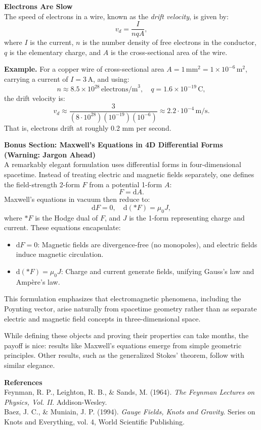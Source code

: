 \begin{technical}
\vspace{0.7em}
\noindent\textbf{Electrons Are Slow}\\[0.5em]
The speed of electrons in a wire, known as the \textit{drift velocity}, is given by:
\[
v_d = \frac{I}{n q A},
\]
where \( I \) is the current, \( n \) is the number density of free electrons in the conductor, \( q \) is the elementary charge, and \( A \) is the cross-sectional area of the wire.

\noindent\textbf{Example.} For a copper wire of cross-sectional area \( A = 1 \, \text{mm}^2 = 1 \times 10^{-6} \, \text{m}^2 \), carrying a current of \( I = 3 \, \text{A} \), and using:
\[
n \approx 8.5 \times 10^{28} \, \text{electrons/m}^3, \quad q = 1.6 \times 10^{-19} \, \text{C},
\]
the drift velocity is:
\[
v_d \approx \frac{3}{(8 \cdot 10^{28})(10^{-19})(10^{-6})} \approx 2.2 \cdot 10^{-4} \, \text{m/s}.
\]
That is, electrons drift at roughly 0.2 mm per second.

\vspace{1em}
\noindent\textbf{Bonus Section: Maxwell’s Equations in 4D Differential Forms (Warning: Jargon Ahead)}\\[0.5em]
A remarkably elegant formulation
uses differential forms in four-dimensional spacetime. Instead of treating electric and magnetic fields separately, one defines the field-strength 2-form \(F\) from a potential 1-form \(A\):  
\[
F = \mathrm{d}A.
\]
Maxwell’s equations in vacuum then reduce to:
\[
\mathrm{d}F = 0, 
\quad
\mathrm{d}(*F) = \mu_0 J,
\]
where \(*F\) is the Hodge dual of \(F\), and \(J\) is the 1-form representing charge and current. These equations encapsulate:
\begin{itemize}[leftmargin=*]
\item \(\mathrm{d}F = 0\): Magnetic fields are divergence-free (no monopoles), and electric fields induce magnetic circulation.
\item \(\mathrm{d}(*F) = \mu_0 J\): Charge and current generate fields, unifying Gauss’s law and Ampère’s law.
\end{itemize}
This formulation emphasizes that electromagnetic phenomena, including the Poynting vector, arise naturally from spacetime geometry rather than as separate electric and magnetic field concepts in three-dimensional space. 

While defining these objects and proving their properties can take months, the payoff is nice: results like Maxwell’s equations emerge from simple geometric principles. Other results, such as the generalized Stokes’ theorem, follow with similar elegance.

\vspace{0.7em}
\noindent\textbf{References}\\
Feynman, R. P., Leighton, R. B., \& Sands, M. (1964). \textit{The Feynman Lectures on Physics, Vol. II}. Addison-Wesley.\\
Baez, J. C., \& Muniain, J. P. (1994). \textit{Gauge Fields, Knots and Gravity}. Series on Knots and Everything, vol. 4, World Scientific Publishing.\\
\end{technical}